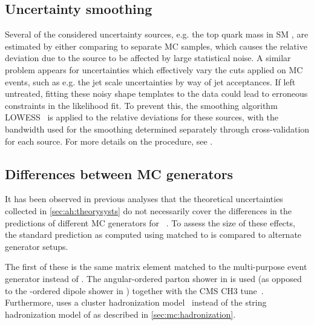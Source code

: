 \subsection{Uncertainty smoothing}
Several of the considered uncertainty sources, e.g. the top quark mass in SM \ttbar, are estimated by either comparing to separate MC samples, which causes the relative deviation due to the source to be affected by large statistical noise. A similar problem appears for uncertainties which effectively vary the cuts applied on MC events, such as e.g. the jet \pt scale uncertainties by way of jet acceptances. If left untreated, fitting these noisy shape templates to the data could lead to erroneous constraints in the likelihood fit. To prevent this, the smoothing algorithm LOWESS~\cite{Cleveland:1979,Cleveland:1988} is applied to the relative deviations for these sources, with the bandwidth used for the smoothing determined separately through cross-validation for each source. For more details on the procedure, see .

\subsection{Differences between MC generators}
\label{sec:ah:gennps}

It has been observed in previous analyses that the theoretical uncertainties collected in \cref{sec:ah:theorysysts} do not necessarily cover the differences in the predictions of different MC generators for \ttbar~\cite{ATLAS:2018ivx,CMS:TOP-17-002,CMS:TOP-23-001,ATLAS:2023fsd}. To assess the size of these effects, the standard \ttbar prediction as computed using \powheg \hvq matched to \pythia is compared to alternate generator setups.%


The first of these is the same \powheg \hvq matrix element matched to the multi-purpose event generator \herwig instead of \pythia. The angular-ordered parton shower in \herwig is used (as opposed to the \pt-ordered dipole shower in \pythia) together with the CMS CH3 tune~\cite{CMS:GEN-19-001}. Furthermore, \herwig uses a cluster hadronization model~\cite{Webber:1983if} instead of the string hadronization model of \pythia as described in \cref{sec:mc:hadronization}.


